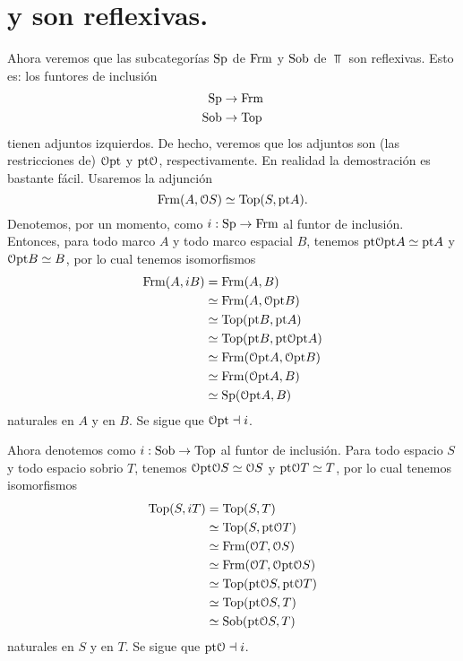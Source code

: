 \section{ y  son reflexivas.}
Ahora veremos que las subcategorías $\mathrm{Sp}$ de $\mathrm{Frm}$ y
$\mathrm{Sob}$ de $\Top$ son reflexivas.
Esto es: los funtores de inclusión
\begin{align*}
    \mathrm{Sp}&\to\mathrm{Frm} \\
    \mathrm{Sob}&\to\mathrm{Top}
\end{align*}
tienen adjuntos izquierdos.
De hecho, veremos que los adjuntos son (las restricciones de)
$\mathcal{O}\mathrm{pt}$ y $\mathrm{pt}\mathcal{O}$, respectivamente.
En realidad la demostración es bastante fácil.
Usaremos la adjunción
\[
    \mathrm{Frm}(A,\mathcal{O}S) \simeq \mathrm{Top}(S,\mathrm{pt} A).
\]
Denotemos, por un momento, como $i:\mathrm{Sp}\to\mathrm{Frm}$ al funtor
de inclusión.
Entonces, para todo marco $A$ y todo marco espacial $B$, tenemos
$\mathrm{pt}\mathcal{O}\mathrm{pt} A\simeq\mathrm{pt} A$ y $\mathcal{O}\mathrm{pt} B\simeq B$, por lo cual
tenemos isomorfismos
\begin{align*}
    \mathrm{Frm}(A,iB)
    &=\mathrm{Frm}(A,B) \\
    &\simeq \mathrm{Frm}(A,\mathcal{O}\mathrm{pt} B) \\
    &\simeq \mathrm{Top}(\mathrm{pt} B,\mathrm{pt} A) \\
    &\simeq \mathrm{Top}(\mathrm{pt} B,\mathrm{pt}\mathcal{O}\mathrm{pt} A) \\
    &\simeq \mathrm{Frm}(\mathcal{O}\mathrm{pt} A,\mathcal{O}\mathrm{pt} B) \\
    &\simeq \mathrm{Frm}(\mathcal{O}\mathrm{pt} A,B) \\
    &\simeq \mathrm{Sp}(\mathcal{O}\mathrm{pt} A,B)
\end{align*}
naturales en $A$ y en $B$.
Se sigue que $\mathcal{O}\mathrm{pt}\dashv i$.

Ahora denotemos como $i:\mathrm{Sob}\to\mathrm{Top}$ al funtor de inclusión.
Para todo espacio $S$ y todo espacio sobrio $T$,
tenemos $\mathcal{O}\mathrm{pt}\mathcal{O}S\simeq\mathcal{O}S$ y $\mathrm{pt}\mathcal{O} T\simeq T$,
por lo cual tenemos isomorfismos
\begin{align*}
    \mathrm{Top}(S,iT)
    &= \mathrm{Top}(S,T) \\
    &\simeq \mathrm{Top}(S,\mathrm{pt}\mathcal{O}T) \\
    &\simeq \mathrm{Frm}(\mathcal{O}T,\mathcal{O}S) \\
    &\simeq \mathrm{Frm}(\mathcal{O}T,\mathcal{O}\mathrm{pt}\mathcal{O}S) \\
    &\simeq \mathrm{Top}(\mathrm{pt}\mathcal{O}S,\mathrm{pt}\mathcal{O}T) \\
    &\simeq \mathrm{Top}(\mathrm{pt}\mathcal{O}S,T) \\
    &\simeq \mathrm{Sob}(\mathrm{pt}\mathcal{O}S,T)
\end{align*}
naturales en $S$ y en $T$.
Se sigue que $\mathrm{pt}\mathcal{O}\dashv i$.

